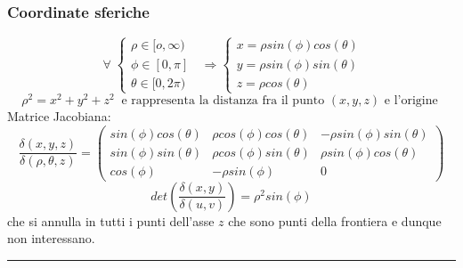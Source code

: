 \subsubsection*{Coordinate sferiche}
\[
    \;\forall\; \begin{cases}
        \rho \in [o,\infty)\\
        \phi \in [0,\pi]\\
        \theta \in [0,2\pi)
    \end{cases} \;\; \Longrightarrow \begin{cases}
        x = \rho sin(\phi) cos(\theta)\\
        y = \rho sin(\phi) sin(\theta)\\
        z = \rho cos(\theta)
    \end{cases}
\]
\[
    \rho^2 = x^2 +y^2+z^2 \;\; \text{e rappresenta la distanza fra il punto $(x,y,z)$ e l'origine}\;
\]
Matrice Jacobiana:
\[
    \frac{\delta(x,y,z)}{\delta(\rho,\theta,z)} = \left(
        \begin{matrix}
            sin(\phi) cos(\theta) & \rho cos(\phi) cos(\theta) & -\rho sin(\phi) sin(\theta)\\ 
            sin(\phi) sin(\theta) & \rho cos(\phi) sin(\theta) & \rho sin(\phi) cos(\theta) \\ 
            cos(\phi) & -\rho sin(\phi) & 0
        \end{matrix}\right)
\]
\[
    det(\frac{\delta(x,y)}{\delta(u,v)}) = \rho^2 sin(\phi)
\]
che si annulla in tutti i punti dell'asse $z$ che sono punti della frontiera e dunque non interessano.\newline
\rule{\textwidth}{2pt}
